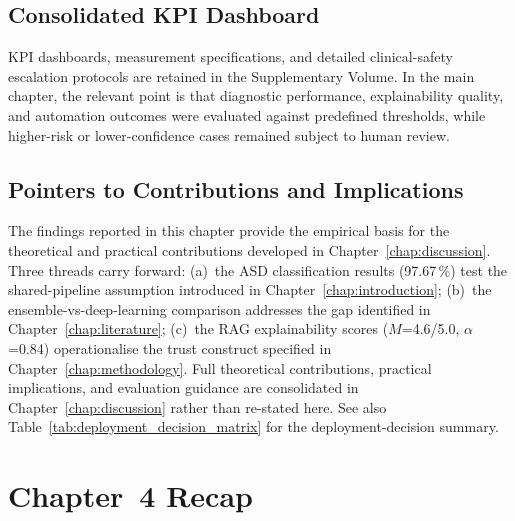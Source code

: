 \subsection{Consolidated KPI Dashboard}

KPI dashboards, measurement specifications, and detailed clinical-safety escalation protocols are retained in the Supplementary Volume. In the main chapter, the relevant point is that diagnostic performance, explainability quality, and automation outcomes were evaluated against predefined thresholds, while higher-risk or lower-confidence cases remained subject to human review.

\fi %


\subsection{Pointers to Contributions and Implications}

The findings reported in this chapter provide the empirical basis for the theoretical and practical contributions developed in Chapter~\ref{chap:discussion}. Three threads carry forward: (a)~the ASD classification results (97.67\,\%) test the shared-pipeline assumption introduced in Chapter~\ref{chap:introduction}; (b)~the ensemble-vs-deep-learning comparison addresses the gap identified in Chapter~\ref{chap:literature}; (c)~the RAG explainability scores ($M$=4.6/5.0, $\alpha$=0.84) operationalise the trust construct specified in Chapter~\ref{chap:methodology}. Full theoretical contributions, practical implications, and evaluation guidance are consolidated in Chapter~\ref{chap:discussion} rather than re-stated here. See also Table~\ref{tab:deployment_decision_matrix} for the deployment-decision summary.


\iffalse
\section{Chapter~4 Recap}

